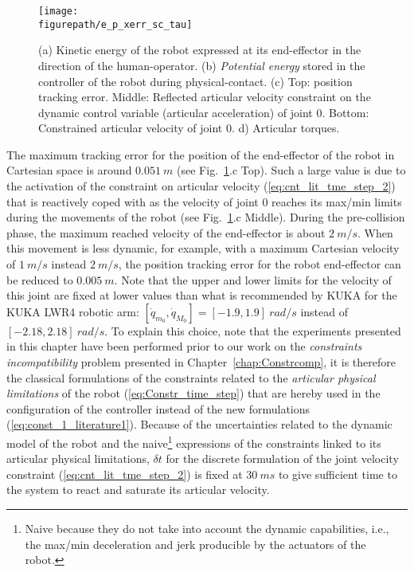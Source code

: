 \begin{figure}[!ht]
\centering
\captionsetup{width=.99\linewidth}\texttt{[image: \\figurepath/e\_p\_xerr\_sc\_tau]}
\caption{(a) Kinetic energy of the robot expressed at its end-effector in the direction of the human-operator. (b) \textit{Potential energy} stored in the controller of the robot during physical-contact. (c) Top: position tracking error. Middle: Reflected articular velocity constraint on the dynamic control variable (articular acceleration) of joint $0$. Bottom: Constrained articular velocity of joint $0$. d) Articular torques.}
\label{fig:e_p_xerr_sc_tau}
\end{figure}
The maximum tracking error for the position of the end-effector of the robot in Cartesian space is around $0.051~m$ (see Fig.~\ref{fig:e_p_xerr_sc_tau}.c Top). Such a large value is due to the activation of the constraint on articular velocity (\ref{eq:cnt_lit_tme_step_2}) that is reactively coped with as the velocity of joint $0$ reaches its max/min limits during the movements of the robot (see Fig.~\ref{fig:e_p_xerr_sc_tau}.c Middle). During the pre-collision phase, the maximum reached velocity of the end-effector is about $2~m/s$. When this movement is less dynamic, for example, with a maximum Cartesian velocity of $1~m/s$ instead $2~m/s$, the position tracking error for the robot end-effector can be reduced to  $0.005~m$. 
Note that the upper and lower limits for the velocity of this joint are fixed at lower values than what is recommended  by KUKA for the KUKA LWR4 robotic arm: $[\dot{q}_{m_{0}}, \dot{q}_{M_{0}}] = [-1.9, 1.9]~rad/s$ instead of $[-2.18, 2.18]~rad/s$. To explain this choice, note that the experiments presented in this chapter have been performed prior to our work on the \textit{constraints incompatibility} problem presented in Chapter~\ref{chap:Constrcomp}, it is therefore the classical formulations of the constraints related to the \textit{articular physical limitations} of the robot (\ref{eq:Constr_time_step}) that are hereby used in the configuration of the controller instead of the new formulations (\ref{eq:const_1_literature1}). Because of the uncertainties related to the dynamic model of the robot and the naive\footnote{Naive because they do not take into account the dynamic capabilities, i.e., the max/min deceleration and jerk producible by the actuators of the robot.} expressions of the constraints linked to its articular physical limitations, $\delta t$ for the discrete formulation of the joint velocity constraint (\ref{eq:cnt_lit_tme_step_2}) is fixed at $30~ms$ to give sufficient time to the system to react and saturate its articular velocity. 
